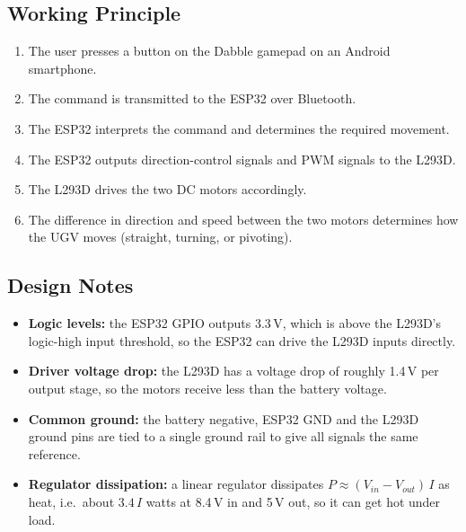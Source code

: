 \documentclass[11pt]{article}
\begin{document}
\subsection{Working Principle}
\begin{enumerate}
    \item The user presses a button on the Dabble gamepad on an Android smartphone.
    \item The command is transmitted to the ESP32 over Bluetooth.
    \item The ESP32 interprets the command and determines the required movement.
    \item The ESP32 outputs direction-control signals and PWM signals to the L293D.
    \item The L293D drives the two DC motors accordingly.
    \item The difference in direction and speed between the two motors determines how the UGV moves (straight, turning, or pivoting).
\end{enumerate}

\subsection{Design Notes}
\begin{itemize}
    \item \textbf{Logic levels:} the ESP32 GPIO outputs 3.3\,V, which is above the L293D's logic-high input threshold, so the ESP32 can drive the L293D inputs directly.
    \item \textbf{Driver voltage drop:} the L293D has a voltage drop of roughly 1.4\,V per output stage, so the motors receive less than the battery voltage.
    \item \textbf{Common ground:} the battery negative, ESP32 GND and the L293D ground pins are tied to a single ground rail to give all signals the same reference.
    \item \textbf{Regulator dissipation:} a linear regulator dissipates $P \approx (V_{in}-V_{out})\,I$ as heat, i.e.\ about $3.4\,I$ watts at 8.4\,V in and 5\,V out, so it can get hot under load.
\end{itemize}
\end{document}
